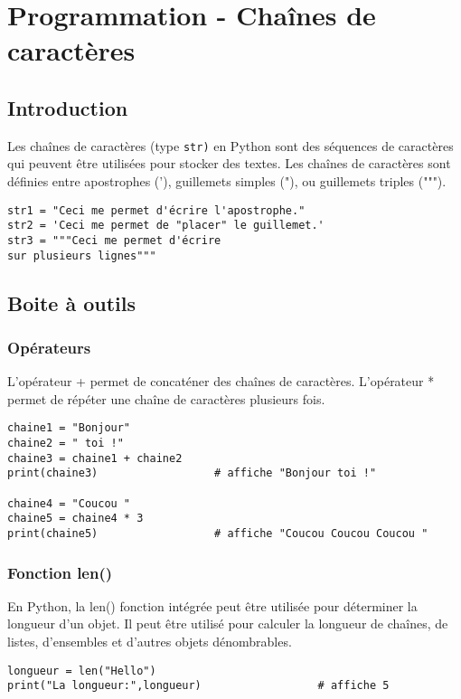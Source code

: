 \documentclass[11pt, a4paper]{book}
\begin{document}
\setcounter{chapter}{8}
\chapter{Programmation - Chaînes de caractères}
\section{Introduction}


Les chaînes de caractères (type \texttt{str)}  en Python sont des séquences de caractères qui peuvent être utilisées pour stocker des textes. Les chaînes de caractères sont définies entre apostrophes ('),  guillemets simples ("), ou  guillemets triples (""").
\begin{lstlisting}
str1 = "Ceci me permet d'écrire l'apostrophe."
str2 = 'Ceci me permet de "placer" le guillemet.'
str3 = """Ceci me permet d'écrire
sur plusieurs lignes"""
\end{lstlisting}

\section{Boite à outils}
\subsection{Opérateurs}
L'opérateur + permet de concaténer des chaînes de caractères.
L'opérateur * permet de répéter une chaîne de caractères plusieurs fois.


\begin{lstlisting}
chaine1 = "Bonjour"
chaine2 = " toi !"
chaine3 = chaine1 + chaine2
print(chaine3) 					# affiche "Bonjour toi !"

chaine4 = "Coucou "
chaine5 = chaine4 * 3
print(chaine5) 					# affiche "Coucou Coucou Coucou "
\end{lstlisting}

\subsection{Fonction len()}
En Python, la len() fonction intégrée peut être utilisée pour déterminer la longueur d'un objet. Il peut être utilisé pour calculer la longueur de chaînes, de listes, d'ensembles et d'autres objets dénombrables.



\begin{lstlisting}
longueur = len("Hello")
print("La longueur:",longueur) 					# affiche 5
\end{lstlisting}
\end{document}
